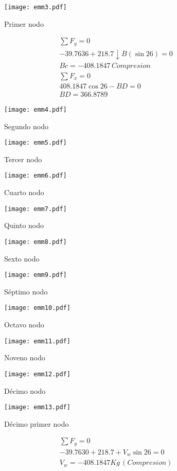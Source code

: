 \begin{figure}[h!]
  \centering
    \texttt{[image: emm3.pdf]}
    \caption{Primer nodo}
    \label{emm3}
  \end{figure}
\begin{align*}
  &\sum F_y = 0\\
  &- 39.7636 + 218.7 \downarrow B\left(\sin{26} \right) = 0\\
  &Bc = - 408.1847\, Compresion\\
  &\sum F_x = 0\\
  &408.1847 \cos{26} - BD = 0\\
  &BD = 366.8789
\end{align*}
\begin{figure}[h!]
\centering
\texttt{[image: emm4.pdf]}
\caption{Segundo nodo}
\label{emm4}
\end{figure}
\begin{figure}[h!]
\centering
\texttt{[image: emm5.pdf]}
\caption{Tercer nodo}
\label{emm5}
\end{figure}
\begin{figure}[h!]
\centering
\texttt{[image: emm6.pdf]}
\caption{Cuarto nodo}
\label{emm6}
\end{figure}
\begin{figure}[h!]
\centering
\texttt{[image: emm7.pdf]}
\caption{Quinto nodo}
\label{emm7}
\end{figure}
\begin{figure}[h!]
\centering
\texttt{[image: emm8.pdf]}
\caption{Sexto nodo}
\label{emm8}
\end{figure}
\begin{figure}[h!]
\centering
\texttt{[image: emm9.pdf]}
\caption{Séptimo nodo}
\label{emm9}
\end{figure}
\begin{figure}[h!]
\centering
\texttt{[image: emm10.pdf]}
\caption{Octavo nodo}
\label{emm10}
\end{figure}
\begin{figure}[h!]
\centering
\texttt{[image: emm11.pdf]}
\caption{Noveno nodo}
\label{emm11}
\end{figure}
\begin{figure}[h!]
\centering
\texttt{[image: emm12.pdf]}
\caption{Décimo nodo}
\label{emm12}
\end{figure}
\begin{figure}[h!]
\centering
\texttt{[image: emm13.pdf]}
\caption{Décimo primer nodo}
\label{emm13}
\end{figure}
\begin{align*}
  &\sum F_y = 0\\
  &- 39.7630 + 218.7 + V_w \sin{26} = 0\\
  &V_w = - 408.1847 Kg\, (Compresion)
\end{align*}
